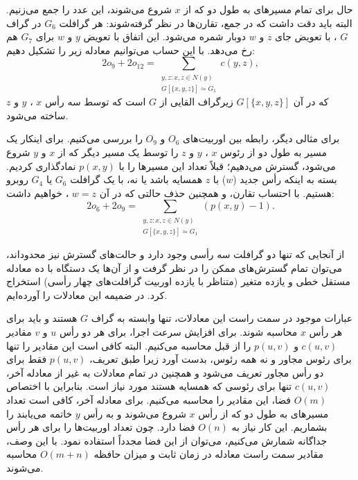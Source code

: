 حال برای تمام مسیرهای به طول دو که از $x$ شروع می‌شوند، این عدد را جمع می‌زنیم. البته باید دقت داشت که در جمع، تقارن‌ها در نظر گرفته‌شوند: هر گرافلت $G_6$  در گراف $G$ ، با تعویض جای $z$ و $w$ دوبار شمره می‌شود. این اتفاق با تعویض $y$‌ و $w$ برای $G_7$ هم رخ می‌دهد. با این حساب می‌توانیم معادله زیر را تشکیل دهیم:
\begin{equation*}
2o_9+2o_{12} = \sum_{\substack{y,z: x,z\in N(y)\\G[\{x,y,z\}] \simeq G_1 }}c(y,z),
\end{equation*}
که در آن $G[\{x,y,z\}]$ زیرگراف القایی از $G$ است که توسط سه رأس $x$ ، $y$ و $z$ ساخته می‌شود.

برای مثالی دیگر، رابطه بین اوربیت‌های $O_6$ و $O_9$ را بررسی می‌کنیم. برای اینکار یک مسیر به طول دو از رئوس $x$ ، $y$ و $z$ را توسط یک مسیر دیگر که از $x$ و $y$ شروع می‌شود، گسترش می‌دهیم؛ قبلاً تعداد این مسیرها را با $p(x,y)$ نمادگذاری کردیم. بسته به اینکه رأس جدید ($w$) با $z$ همسایه باشد یا نه، با یک گرافلت $G_6$ یا $G_4$ روبرو هستیم. با احتساب تقارن، و همچنین حذف حالتی که در آن $w=z$ ، خواهیم داشت:
\begin{equation*}
2o_6+2o_9 = \sum_{\substack{y,z: x,z\in N(y)\\G[\{x,y,z\}] \simeq G_1 }}(p(x,y) - 1).
\end{equation*}

از آنجایی که تنها دو گرافلت سه رأسی وجود دارد و حالت‌های گسترش نیز محدود‌اند، می‌توان تمام گسترش‌های ممکن را در نظر گرفت و از آن‌ها یک دستگاه با ده معادله مستقل خطی و یازده متغیر (متناظر با یازده اوربیت گرافلت‌های چهار رأسی) استخراج کرد. در ضمیمه  این معادلات را آورده‌ایم.

عبارات موجود در سمت راست این معادلات، تنها وابسته به گراف $G$ هستند و باید برای هر رأس $x$ محاسبه شوند. برای افزایش سرعت اجرا، برای هر دو رأس $u$ و $v$ مقادیر $c(u,v)$ و $p(u,v)$ را از قبل محاسبه می‌کنیم. البته کافی است این مقادیر را تنها برای رئوس مجاور و نه همه رئوس، بدست آورد زیرا طبق تعریف، $p(u,v)$ فقط برای دو رأس مجاور تعریف می‌شود و همچنین در تمام معادلات به غیر از معادله آخر، $c(u,v)$ تنها برای رئوسی که همسایه هستند مورد نیاز است. بنابراین با اختصاص $O(m)$ فضا، این مقادیر را محاسبه می‌کنیم. برای معادله آخر، کافی است تعداد مسیر‌های به طول دو که از رأس $x$ شروع می‌شوند و به رأس $y$ خاتمه می‌یابند را بشماریم. این کار نیاز به $O(n)$ فضا دارد. چون تعداد اوربیت‌ها را برای هر رأس جداگانه شمارش می‌کنیم، می‌توان از این فضا مجدداً استفاده نمود. با این وصف، مقادیر سمت راست معادله در زمان ثابت و میزان حافظه $O(m+n)$ محاسبه می‌شوند.

